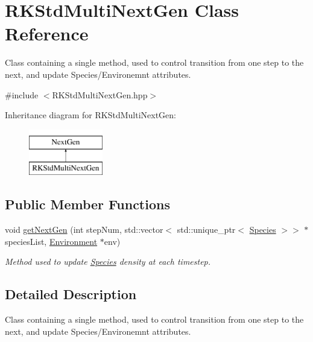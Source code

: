 \hypertarget{classRKStdMultiNextGen}{}\section{R\+K\+Std\+Multi\+Next\+Gen Class Reference}
\label{classRKStdMultiNextGen}


Class containing a single method, used to control transition from one step to the next, and update Species/\+Environemnt attributes.  




{\ttfamily \#include $<$R\+K\+Std\+Multi\+Next\+Gen.\+hpp$>$}

Inheritance diagram for R\+K\+Std\+Multi\+Next\+Gen\+:\begin{figure}[H]
\begin{center}
\leavevmode
\includegraphics[height=2.000000cm]{classRKStdMultiNextGen}
\end{center}
\end{figure}
\subsection*{Public Member Functions}
\begin{DoxyCompactItemize}
\item 
void \hyperlink{classRKStdMultiNextGen_a78bb057338585e29d4b8fb9962a59a3c}{get\+Next\+Gen} (int step\+Num, std\+::vector$<$ std\+::unique\+\_\+ptr$<$ \hyperlink{classSpecies}{Species} $>$$>$ $\ast$species\+List, \hyperlink{classEnvironment}{Environment} $\ast$env)
\begin{DoxyCompactList}\small\item\em Method used to update \hyperlink{classSpecies}{Species} density at each timestep. \end{DoxyCompactList}\end{DoxyCompactItemize}


\subsection{Detailed Description}
Class containing a single method, used to control transition from one step to the next, and update Species/\+Environemnt attributes. 


